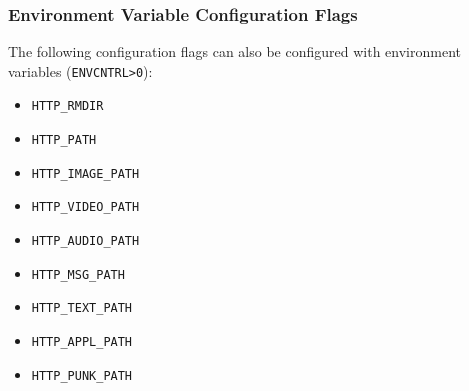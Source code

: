 \documentclass[documentation]{subfiles}
\begin{document}
\subsubsection{Environment Variable Configuration Flags}
The following configuration flags can also be configured with environment variables ({\tt ENVCNTRL>0}):
\begin{itemize}
    \item {\tt HTTP\_RMDIR}
    \item {\tt HTTP\_PATH}
    \item {\tt HTTP\_IMAGE\_PATH}
    \item {\tt HTTP\_VIDEO\_PATH}
    \item {\tt HTTP\_AUDIO\_PATH}
    \item {\tt HTTP\_MSG\_PATH}
    \item {\tt HTTP\_TEXT\_PATH}
    \item {\tt HTTP\_APPL\_PATH}
    \item {\tt HTTP\_PUNK\_PATH}
\end{itemize}
\end{document}
